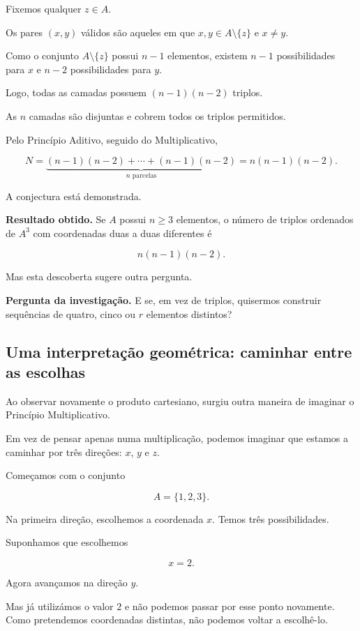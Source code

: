 \documentclass[11pt,a4paper,oneside]{book}
\newcommand{\Pergunta}[1]{\begin{perguntabox}\textbf{Pergunta da investigação.} #1\end{perguntabox}}
\begin{document}
Fixemos qualquer $z\in A$.

Os pares $(x,y)$ válidos são aqueles em que
$x,y\in A\setminus\{z\}$ e $x\neq y$.

Como o conjunto $A\setminus\{z\}$ possui $n-1$
elementos, existem $n-1$ possibilidades para $x$
e $n-2$ possibilidades para $y$.

Logo, todas as camadas possuem
$(n-1)(n-2)$ triplos.

As $n$ camadas são disjuntas e cobrem todos os
triplos permitidos.

Pelo Princípio Aditivo, seguido do Multiplicativo,

\[
N=\underbrace{
(n-1)(n-2)+\cdots+(n-1)(n-2)
}_{n\text{ parcelas}}
=n(n-1)(n-2).
\]

A conjectura está demonstrada.

\medskip

\noindent\textbf{Resultado obtido.}
Se $A$ possui $n\geq3$ elementos, o número de
triplos ordenados de $A^3$ com coordenadas duas
a duas diferentes é

\[
\boxed{n(n-1)(n-2)}.
\]

\medskip

Mas esta descoberta sugere outra pergunta.

\Pergunta{E se, em vez de triplos, quisermos
construir sequências de quatro, cinco ou
$r$ elementos distintos?}


\subsection*{Uma interpretação geométrica: caminhar entre as escolhas}

Ao observar novamente o produto cartesiano, surgiu
outra maneira de imaginar o Princípio Multiplicativo.

Em vez de pensar apenas numa multiplicação, podemos
imaginar que estamos a caminhar por três direções:
$x$, $y$ e $z$.

Começamos com o conjunto

\[
A=\{1,2,3\}.
\]

Na primeira direção, escolhemos a coordenada $x$.
Temos três possibilidades.

Suponhamos que escolhemos

\[
x=2.
\]

Agora avançamos na direção $y$.

Mas já utilizámos o valor $2$ e não podemos passar por esse ponto novamente. Como pretendemos
coordenadas distintas, não podemos voltar a
escolhê-lo.
\end{document}
